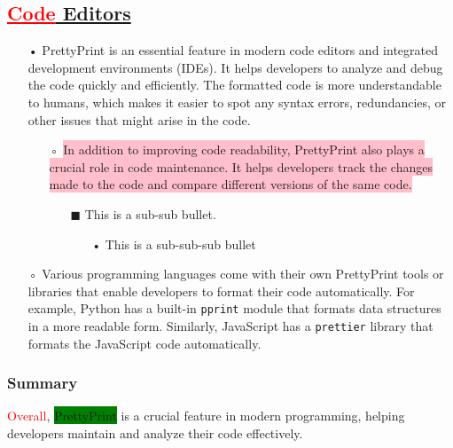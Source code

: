 \documentclass[12pt, a4paper]{article}
\begin{document}
\subsection{\textcolor{red}{\underline{Code}}\underline{ Editors}}
\begin{itemize}
\item[•] PrettyPrint is an essential feature in modern code editors and integrated development environments (IDEs). It helps developers to analyze and debug the code quickly and efficiently. The formatted code is more understandable to humans, which makes it easier to spot any syntax errors, redundancies, or other issues that might arise in the code.
\begin{itemize}
\item[◦] \colorbox{pink}{In addition to improving code readability, PrettyPrint also plays a crucial role in code maintenance. It helps developers track the changes made to the code and compare different versions of the same code.}
\begin{itemize}
\item[$\blacksquare$] This is a sub-sub bullet.
\begin{itemize}
\item[•] This is a sub-sub-sub bullet
\end{itemize}
\end{itemize}
\end{itemize}
\item[◦] Various programming languages come with their own PrettyPrint tools or libraries that enable developers to format their code automatically. For example, Python has a built-in \texttt{pprint} module that formats data structures in a more readable form. Similarly, JavaScript has a \texttt{prettier} library that formats the JavaScript code automatically.
\end{itemize}
\subsubsection{Summary}
\textcolor{red}{Overall}, \colorbox{green}{PrettyPrint} is a crucial feature in modern programming, helping developers maintain and analyze their code effectively.
\end{document}
